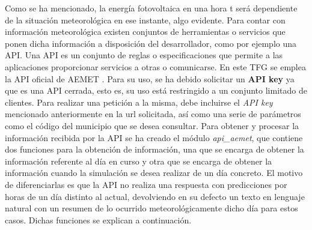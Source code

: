 Como se ha mencionado, la energía fotovoltaica en una hora t será dependiente de la situación meteorológica en ese instante, algo evidente. Para contar con información meteorológica existen conjuntos de herramientas o servicios que ponen dicha información a disposición del desarrollador, como por ejemplo una API. Una \gls{API} es un conjunto de reglas o especificaciones que permite a las aplicaciones proporcionar servicios a otras o comunicarse. En este \gls{TFG} se emplea la \gls{API} oficial de AEMET \cite{Aemet}. Para su uso, se ha debido solicitar un \textbf{API key} ya que es una \gls{API} cerrada, esto es, su uso está restringido a un conjunto limitado de clientes. Para realizar una petición a la misma, debe incluirse el \textit{API key} mencionado anteriormente en la url solicitada, así como una serie de parámetros como el código del municipio que se desea consultar. Para obtener y procesar la información recibida por la \gls{API} se ha creado el módulo \textit{api\_aemet}, que contiene dos funciones para la obtención de información, una que se encarga de obtener la información referente al día en curso y otra que se encarga de obtener la información cuando la simulación se desea realizar de un día concreto. El motivo de diferenciarlas es que la \gls{API} no realiza una respuesta con predicciones por horas de un día distinto al actual, devolviendo en su defecto un texto en lenguaje natural con un resumen de lo ocurrido meteorológicamente dicho día para estos casos. Dichas funciones se explican a continuación.

